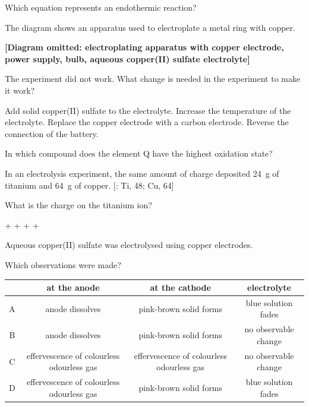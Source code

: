 \documentclass[11pt]{exam}
\begin{document}
\begin{questions}
\question Which equation represents an endothermic reaction?

\begin{choices}
\choice {}
\choice {}
\choice {}
\choice {}
\end{choices}

\newpage

\question The diagram shows an apparatus used to electroplate a metal ring with copper.

\textbf{[Diagram omitted: electroplating apparatus with copper electrode, power supply, bulb, aqueous copper(II) sulfate electrolyte]}

The experiment did not work. What change is needed in the experiment to make it work?

\begin{choices}
\choice Add solid copper(II) sulfate to the electrolyte.
\choice Increase the temperature of the electrolyte.
\choice Replace the copper electrode with a carbon electrode.
\choice Reverse the connection of the battery.
\end{choices}

\question In which compound does the element Q have the highest oxidation state?

\begin{choices}
\choice {}
\choice {}
\choice {}
\choice {}
\end{choices}

\question In an electrolysis experiment, the same amount of charge deposited \qty{24}{\g} of titanium and \qty{64}{\g} of copper. [: Ti, 48; Cu, 64]

What is the charge on the titanium ion?

\begin{choices}
+
+
+
+
\end{choices}

\question Aqueous copper(II) sulfate was electrolysed using copper electrodes.

Which observations were made?

\begin{tabular}{|c|c|c|c|}
\hline
 & at the anode & at the cathode & electrolyte \\
\hline
A & anode dissolves & pink-brown solid forms & blue solution fades \\
B & anode dissolves & pink-brown solid forms & no observable change \\
C & effervescence of colourless odourless gas & effervescence of colourless odourless gas & no observable change \\
D & effervescence of colourless odourless gas & pink-brown solid forms & blue solution fades \\
\hline
\end{tabular}


\end{questions}
\end{document}
